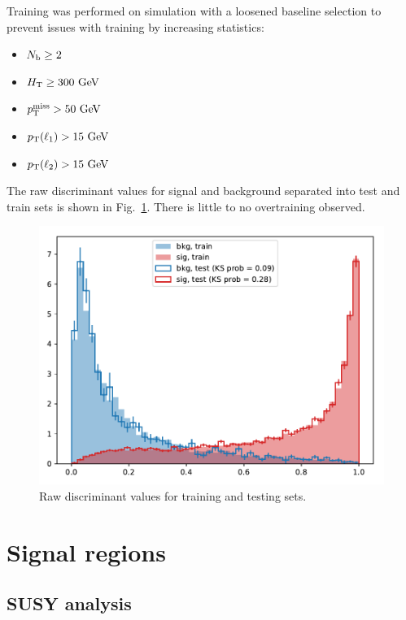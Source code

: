 Training was performed on simulation with a loosened \smft baseline selection 
to prevent issues with training by increasing statistics:
\begin{itemize}
    \item $N_\mathrm{b} \geq 2$
    \item $H_{\mathrm{T}} \geq 300~\text{GeV}$
    \item $p_{\mathrm{T}}^\text{miss}>50~\text{GeV}$
    \item $p_{\mathrm{T}}(\ell_1)>15~\text{GeV}$
    \item $p_{\mathrm{T}}(\ell_2)>15~\text{GeV}$
\end{itemize}

The raw discriminant values for signal and background separated into test and train sets
is shown in Fig.~\ref{fig:xgboostdisc}. There is little to no overtraining
observed.

\begin{figure}[!hbtp]
\centering
\includegraphics[width=.70\textwidth]{figs/ftan/xgboostdisc}
\caption{
    Raw discriminant values for training and testing sets.
}
\label{fig:xgboostdisc}
\end{figure}

\FloatBarrier

\section{Signal regions}

\subsection{SUSY analysis}

